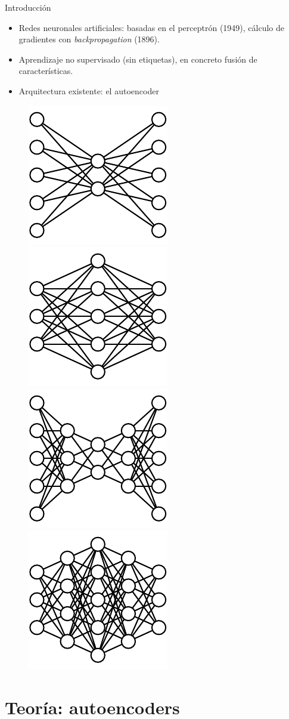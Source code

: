 
\begin{frame}{Introducción}

\begin{itemize}
\item Redes neuronales artificiales: basadas en el \alert{perceptrón} (1949), cálculo de gradientes con \alert{\textit{backpropagation}} (1896).
\item Aprendizaje no supervisado (sin etiquetas), en concreto \alert{fusión de características}.
\item Arquitectura existente: el \alert{autoencoder}
\end{itemize}

\begin{figure}[h!]
\centering
\includegraphics[width=0.2\linewidth]{../inffus/ShallowUndercomplete.pdf}\quad
\includegraphics[width=0.2\linewidth]{../inffus/ShallowOvercomplete.pdf} \quad
\includegraphics[width=0.2\linewidth]{../inffus/DeepUndercomplete.pdf} \quad
\includegraphics[width=0.2\linewidth]{../inffus/DeepOvercomplete.pdf} 
\end{figure}


\end{frame}


\section{Teoría: autoencoders}
